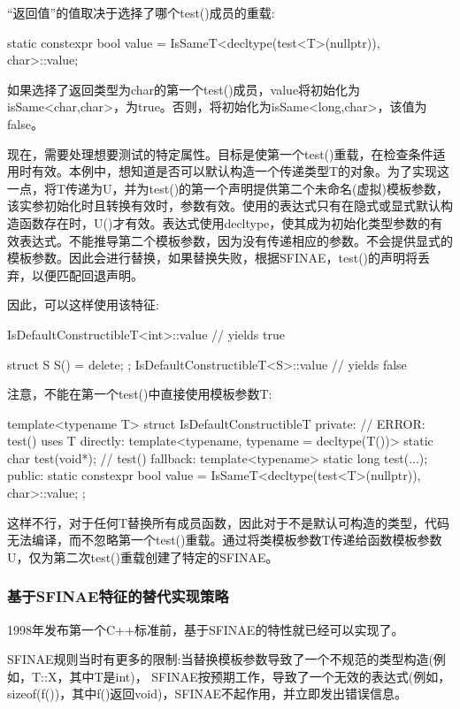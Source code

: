 “返回值”的值取决于选择了哪个test()成员的重载:

\begin{cpp}
static constexpr bool value
	= IsSameT<decltype(test<T>(nullptr)), char>::value;
\end{cpp}

如果选择了返回类型为char的第一个test()成员，value将初始化为isSame<char,char>，为true。否则，将初始化为isSame<long,char>，该值为false。

现在，需要处理想要测试的特定属性。目标是使第一个test()重载，在检查条件适用时有效。本例中，想知道是否可以默认构造一个传递类型T的对象。为了实现这一点，将T传递为U，并为test()的第一个声明提供第二个未命名(虚拟)模板参数，该实参初始化时且转换有效时，参数有效。使用的表达式只有在隐式或显式默认构造函数存在时，U()才有效。表达式使用decltype，使其成为初始化类型参数的有效表达式。不能推导第二个模板参数，因为没有传递相应的参数。不会提供显式的模板参数。因此会进行替换，如果替换失败，根据SFINAE，test()的声明将丢弃，以便匹配回退声明。

因此，可以这样使用该特征:

\begin{cpp}
IsDefaultConstructibleT<int>::value // yields true

struct S {
	S() = delete;
};
IsDefaultConstructibleT<S>::value // yields false
\end{cpp}

注意，不能在第一个test()中直接使用模板参数T:

\begin{cpp}
template<typename T>
struct IsDefaultConstructibleT {
	private:
	// ERROR: test() uses T directly:
	template<typename, typename = decltype(T())>
		static char test(void*);
	// test() fallback:
	template<typename>
		static long test(...);
	public:
	static constexpr bool value
		= IsSameT<decltype(test<T>(nullptr)), char>::value;
};
\end{cpp}

这样不行，对于任何T替换所有成员函数，因此对于不是默认可构造的类型，代码无法编译，而不忽略第一个test()重载。通过将类模板参数T传递给函数模板参数U，仅为第二次test()重载创建了特定的SFINAE。

\subsubsection{基于SFINAE特征的替代实现策略}

1998年发布第一个C++标准前，基于SFINAE的特性就已经可以实现了。

\begin{notice}
SFINAE规则当时有更多的限制:当替换模板参数导致了一个不规范的类型构造(例如，T::X，其中T是int)， SFINAE按预期工作，导致了一个无效的表达式(例如，sizeof(f())，其中f()返回void)，SFINAE不起作用，并立即发出错误信息。
\end{notice}

